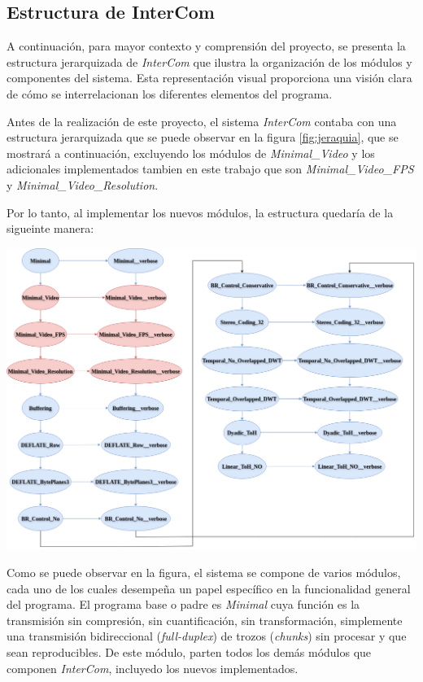 \subsection{Estructura de InterCom}

A continuación, para mayor contexto y comprensión del proyecto, se presenta la estructura jerarquizada de \textit{InterCom} que ilustra la organización de los módulos y componentes del sistema. Esta representación visual proporciona una visión clara de cómo se interrelacionan los diferentes elementos del programa.
\vspace{\baselineskip}

Antes de la realización de este proyecto, el sistema \textit{InterCom} contaba con una estructura jerarquizada que se puede observar en la figura \ref{fig:jeraquia}, que se mostrará a continuación, excluyendo los módulos de \textit{Minimal\_Video} y los adicionales implementados tambien en este trabajo que son \textit{Minimal\_Video\_FPS} y \textit{Minimal\_Video\_Resolution}. 

\vspace{\baselineskip}
Por lo tanto, al implementar los nuevos módulos, la estructura quedaría de la sigueinte manera:

\begin{center}
	\includegraphics[width = 1.01\textwidth]{images/jerarquia_modulos.png}
	\label{fig:jeraquia}
\end{center}

\vspace{\baselineskip}
Como se puede observar en la figura, el sistema se compone de varios módulos, cada uno de los cuales desempeña un papel específico en la funcionalidad general del programa. El programa base o padre es \textit{Minimal} cuya función es la transmisión sin compresión, sin cuantificación, sin transformación, simplemente una transmisión bidireccional (\textit{full-duplex}) de trozos (\textit{chunks}) sin procesar y que sean reproducibles. De este módulo, parten todos los demás módulos que componen \textit{InterCom}, incluyedo los nuevos implementados. 
\vspace{\baselineskip}

